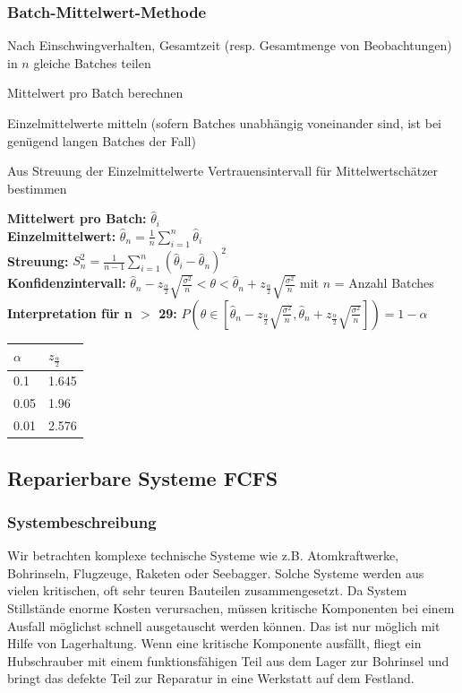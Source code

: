\subsubsection{Batch-Mittelwert-Methode}
\begin{compactenum}
	\item Nach Einschwingverhalten, Gesamtzeit (resp. Gesamtmenge von Beobachtungen) in $n$ gleiche Batches teilen
	\item Mittelwert pro Batch berechnen
	\item Einzelmittelwerte mitteln (sofern Batches unabhängig voneinander sind, ist bei genügend langen Batches der Fall)
	\item Aus Streuung der Einzelmittelwerte Vertrauensintervall für Mittelwertschätzer bestimmen
\end{compactenum}
\begin{minipage}[h]{0.8\textwidth}
	\textbf{Mittelwert pro Batch:} $\hat{\theta}_i$\\
	\textbf{Einzelmittelwert:} $\hat{\theta}_n=\frac{1}{n}\sum_{i=1}^{n}\hat{\theta}_i$\\
	\textbf{Streuung:} $S_n^2=\frac{1}{n-1}\sum_{i=1}^{n}(\hat{\theta}_i-\hat{\theta}_n)^2$ \\
	\textbf{Konfidenzintervall:} $\hat{\theta}_n-z_{\frac{\alpha}{2}}\sqrt{\frac{\sigma^2}{n}} < \theta < \hat{\theta}_n+z_{\frac{\alpha}{2}}\sqrt{\frac{\sigma^2}{n}}$ mit $n$ = Anzahl Batches \\
	\textbf{Interpretation für n $>$ 29:} $P(\theta \in [\hat{\theta}_n-z_{\frac{\alpha}{2}}\sqrt{\frac{\sigma^2}{n}}, \hat{\theta}_n+z_{\frac{\alpha}{2}}\sqrt{\frac{\sigma^2}{n}}])=1-\alpha$
\end{minipage}
\begin{minipage}[h]{0.2\textwidth}
	\begin{tabular}{|l|l|}
		\hline
		$\alpha$ & $z_{\frac{\alpha}{2}}$ \\ \hline
		0.1 & 1.645 \\ \hline
		0.05 & 1.96 \\ \hline
		0.01 & 2.576 \\ \hline
	\end{tabular}
\end{minipage}	

\subsection{Reparierbare Systeme FCFS}
\subsubsection{Systembeschreibung} 
Wir betrachten komplexe technische Systeme wie z.B. Atomkraftwerke, Bohrinseln, Flugzeuge, Raketen oder Seebagger. Solche Systeme werden aus vielen kritischen, oft sehr teuren Bauteilen zusammengesetzt. Da System Stillstände enorme Kosten verursachen, müssen kritische Komponenten bei einem Ausfall möglichst schnell ausgetauscht werden können. Das ist nur möglich mit Hilfe von Lagerhaltung. Wenn eine kritische Komponente ausfällt, fliegt ein Hubschrauber mit einem funktionsfähigen Teil aus dem Lager zur Bohrinsel und bringt das defekte Teil zur Reparatur in eine Werkstatt auf dem Festland. 

